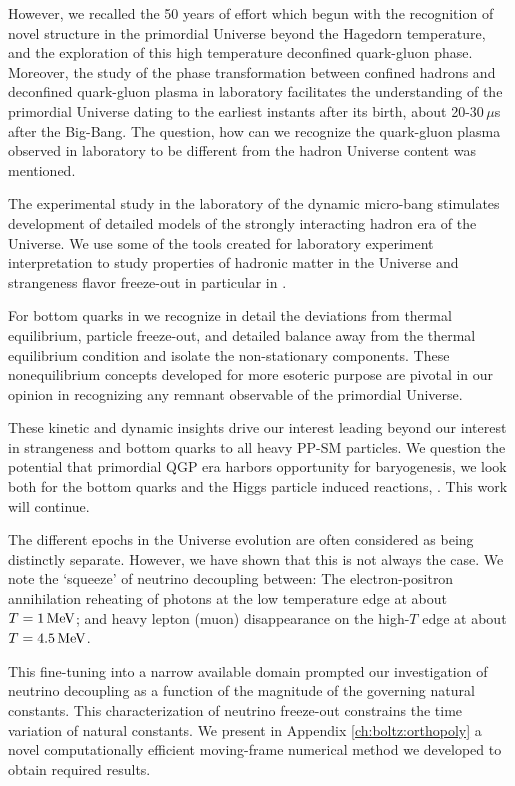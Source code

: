 However, we recalled the 50 years of effort which begun with the recognition of novel structure in the primordial Universe beyond the Hagedorn temperature, and the exploration of this high temperature deconfined quark-gluon phase. Moreover, the study of the phase transformation between confined hadrons and deconfined quark-gluon plasma in laboratory facilitates the understanding of the primordial Universe dating to the earliest instants after its birth, about 20-30\,$\mu$s after the Big-Bang. The question, how can we recognize the quark-gluon plasma observed in laboratory to be different from the hadron Universe content was mentioned. 

The experimental study in the laboratory  of the dynamic micro-bang stimulates development of detailed models of the strongly interacting hadron era of the Universe. We use some of the  tools created for laboratory experiment interpretation to study properties of hadronic matter in the Universe and strangeness flavor freeze-out in particular in .  

For bottom quarks in  we recognize in detail the deviations from thermal equilibrium, particle freeze-out, and detailed balance away from the thermal equilibrium condition and isolate the non-stationary components. These nonequilibrium concepts developed for more esoteric purpose are pivotal in our opinion in recognizing any remnant observable of the primordial Universe. 

These kinetic and dynamic insights drive our interest leading beyond our interest in strangeness and bottom quarks to all heavy PP-SM particles. We question the potential that primordial QGP era harbors opportunity  for baryogenesis, we look both for the bottom quarks and the Higgs particle induced reactions, . This work will continue.

The different epochs in the Universe evolution are often considered as being distinctly separate. However, we have shown that this is not always the case. We note the `squeeze' of neutrino decoupling between: The electron-positron annihilation reheating of photons at the low temperature edge at about $T=1\text{\,MeV}$; and heavy lepton (muon) disappearance on the high-$T$ edge at about $T=4.5\text{\,MeV}$. 

This fine-tuning into a narrow available domain prompted our investigation of neutrino decoupling as a function of the magnitude of the governing natural constants. This characterization of neutrino freeze-out constrains the time variation of natural constants. We present in Appendix \ref{ch:boltz:orthopoly} a novel computationally efficient moving-frame numerical method we developed to obtain required results.

